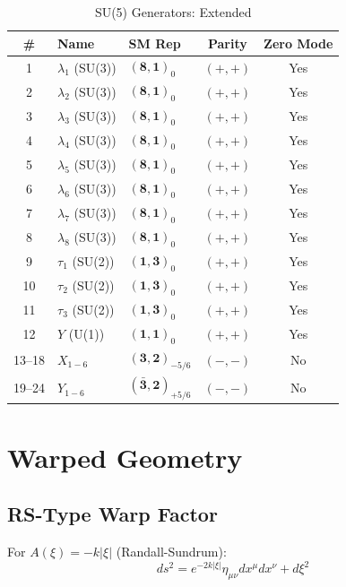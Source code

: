 \documentclass[11pt,a4paper]{article}
\begin{document}
\begin{table}[ht]
\centering
\caption{SU(5) Generators: Extended}
\label{tab:app-su5-extended}
\small
\begin{tabular}{cllcc}
\toprule
\# & Name & SM Rep & Parity & Zero Mode \\
\midrule
1 & $\lambda_1$ (SU(3)) & $(\mathbf{8},\mathbf{1})_0$ & $(+,+)$ & Yes \\
2 & $\lambda_2$ (SU(3)) & $(\mathbf{8},\mathbf{1})_0$ & $(+,+)$ & Yes \\
3 & $\lambda_3$ (SU(3)) & $(\mathbf{8},\mathbf{1})_0$ & $(+,+)$ & Yes \\
4 & $\lambda_4$ (SU(3)) & $(\mathbf{8},\mathbf{1})_0$ & $(+,+)$ & Yes \\
5 & $\lambda_5$ (SU(3)) & $(\mathbf{8},\mathbf{1})_0$ & $(+,+)$ & Yes \\
6 & $\lambda_6$ (SU(3)) & $(\mathbf{8},\mathbf{1})_0$ & $(+,+)$ & Yes \\
7 & $\lambda_7$ (SU(3)) & $(\mathbf{8},\mathbf{1})_0$ & $(+,+)$ & Yes \\
8 & $\lambda_8$ (SU(3)) & $(\mathbf{8},\mathbf{1})_0$ & $(+,+)$ & Yes \\
9 & $\tau_1$ (SU(2)) & $(\mathbf{1},\mathbf{3})_0$ & $(+,+)$ & Yes \\
10 & $\tau_2$ (SU(2)) & $(\mathbf{1},\mathbf{3})_0$ & $(+,+)$ & Yes \\
11 & $\tau_3$ (SU(2)) & $(\mathbf{1},\mathbf{3})_0$ & $(+,+)$ & Yes \\
12 & $Y$ (U(1)) & $(\mathbf{1},\mathbf{1})_0$ & $(+,+)$ & Yes \\
13--18 & $X_{1-6}$ & $(\mathbf{3},\mathbf{2})_{-5/6}$ & $(-,-)$ & No \\
19--24 & $Y_{1-6}$ & $(\bar{\mathbf{3}},\mathbf{2})_{+5/6}$ & $(-,-)$ & No \\
\bottomrule
\end{tabular}
\end{table}

\section{Warped Geometry}
\label{app:warped}

\subsection{RS-Type Warp Factor}

For $A(\xi) = -k|\xi|$ (Randall-Sundrum):
\begin{equation}
  ds^2 = e^{-2k|\xi|} \eta_{\mu\nu} dx^\mu dx^\nu + d\xi^2
  \label{eq:app-rs-metric}
\end{equation}
\end{document}
